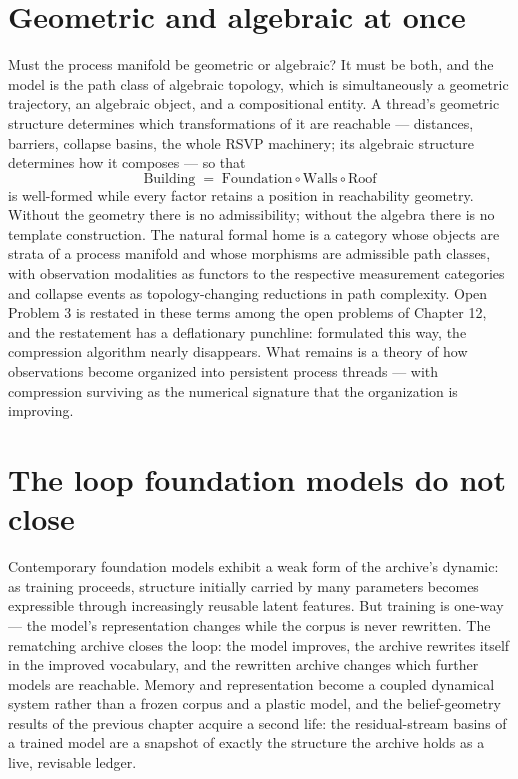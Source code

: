 \documentclass[11pt,oneside]{book}
\theoremstyle{remark}
\begin{document}
\section{Geometric and algebraic at once}

Must the process manifold be geometric or algebraic? It must be both,
and the model is the path class of algebraic topology, which is
simultaneously a geometric trajectory, an algebraic object, and a
compositional entity. A thread's geometric structure determines which
transformations of it are reachable --- distances, barriers, collapse
basins, the whole RSVP machinery; its algebraic structure determines
how it composes --- so that
\[
\text{Building} \;=\; \text{Foundation} \circ \text{Walls} \circ
\text{Roof}
\]
is well-formed while every factor retains a position in reachability
geometry. Without the geometry there is no admissibility; without the
algebra there is no template construction. The natural formal home is
a category whose objects are strata of a process manifold and whose
morphisms are admissible path classes, with observation modalities as
functors to the respective measurement categories and collapse events
as topology-changing reductions in path complexity. Open Problem 3 is
restated in these terms among the open problems of Chapter 12, and the restatement has a
deflationary punchline: formulated this way, the compression algorithm
nearly disappears. What remains is a theory of how observations become
organized into persistent process threads --- with compression
surviving as the numerical signature that the organization is
improving.

\section{The loop foundation models do not close}

Contemporary foundation models exhibit a weak form of the archive's
dynamic: as training proceeds, structure initially carried by many
parameters becomes expressible through increasingly reusable latent
features. But training is one-way --- the model's representation
changes while the corpus is never rewritten. The rematching archive
closes the loop: the model improves, the archive rewrites itself in the
improved vocabulary, and the rewritten archive changes which further
models are reachable. Memory and representation become a coupled
dynamical system rather than a frozen corpus and a plastic model, and
the belief-geometry results of the previous chapter acquire a second
life: the residual-stream basins of a trained model are a snapshot of
exactly the structure the archive holds as a live, revisable ledger.
\end{document}
